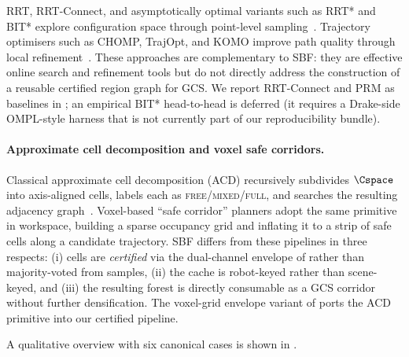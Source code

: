\documentclass[journal]{IEEEtran}
\begin{document}
RRT, RRT-Connect, and asymptotically optimal variants such as RRT* and
BIT* explore configuration space through point-level
sampling~\cite{lavalle1998rapidly,kuffner2000rrt,karaman2011sampling,
gammell2020batch}.
Trajectory optimisers such as CHOMP, TrajOpt, and KOMO improve path
quality through local refinement~\cite{ratliff2009chomp,
schulman2014motion,toussaint2017newton}.
These approaches are complementary to SBF: they are effective online
search and refinement tools but do not directly address the construction
of a reusable certified region graph for GCS.
We report RRT-Connect and PRM as baselines in ;
an empirical BIT* head-to-head is deferred (it requires a Drake-side
OMPL-style harness that is not currently part of our reproducibility
bundle).

\paragraph{Approximate cell decomposition and voxel safe corridors.}
Classical approximate cell decomposition (ACD) recursively subdivides
$\Cspace$ into axis-aligned cells, labels each as
\textsc{free}/\textsc{mixed}/\textsc{full}, and searches the resulting
adjacency graph~\cite{lozanoperez1983spatial,brooks1985subdivision}.
Voxel-based ``safe corridor'' planners adopt the same primitive in
workspace, building a sparse occupancy grid and inflating it to a
strip of safe cells along a candidate trajectory. SBF differs from
these pipelines in three respects: (i) cells are
\emph{certified} via the dual-channel envelope of 
rather than majority-voted from samples, (ii) the cache is
robot-keyed rather than scene-keyed, and (iii) the resulting forest
is directly consumable as a GCS corridor without further
densification. The voxel-grid envelope variant of
 ports the ACD primitive into our
certified pipeline.

A qualitative overview with six canonical cases is shown in
.
\end{document}
